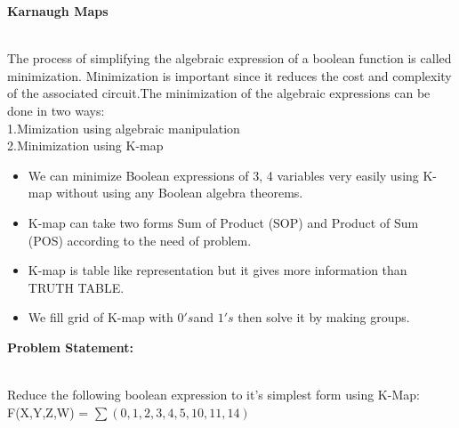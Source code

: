 \documentclass[10pt,a4paper]{report}
\begin{document}
\begin{multicols}{2}
\hspace{7.5cm} \textbf{Karnaugh Maps}\vspace{0.5cm}
\raggedright \\The process of simplifying the algebraic expression of a boolean function is called minimization. Minimization is important since it reduces the cost and complexity of the associated circuit.The minimization of the algebraic expressions can be done in two ways:\\1.Mimization using algebraic manipulation\\2.Minimization using K-map \vspace{3mm} \\ \begin{itemize}


\item We can minimize Boolean expressions of 3, 4 variables very easily using K-map without using any Boolean algebra theorems.
\item K-map can take two forms Sum of Product (SOP) and Product of Sum (POS) according to the need of problem. 
\item K-map is table like representation but it gives more information than TRUTH TABLE.
\item We fill grid of K-map with $0's $and $1's$ then solve it by making groups.\vspace{2mm}
\end{itemize}
\raggedright \textbf{Problem Statement:}\vspace{2mm}
\raggedright \\Reduce the following boolean expression to it's simplest form using K-Map:
\center F(X,Y,Z,W) = $\sum(0,1,2,3,4,5,10,11,14)$
\vspace{5mm}



\newcommand{\implicantsol}[3][0]{
    \draw[rounded corners=3pt, fill=#3, opacity=0.3] ($(#2.north west)+(135:#1)$) rectangle ($(#2.south east)+(-45:#1)$);
    }


\newcommand{\implicant}[4][0]{
    \draw[rounded corners=3pt, fill=#4, opacity=0.3] ($(#2.north west)+(135:#1)$) rectangle ($(#3.south east)+(-45:#1)$);
    }

\newcommand{\implicantcostats}[4][0]{
    \draw[rounded corners=3pt, fill=#4, opacity=0.3] ($(rf.east |- #2.north)+(90:#1)$)-| ($(#2.east)+(0:#1)$) |- ($(rf.east |- #3.south)+(-90:#1)$);
    \draw[rounded corners=3pt, fill=#4, opacity=0.3] ($(cf.west |- #2.north)+(90:#1)$) -| ($(#3.west)+(180:#1)$) |- ($(cf.west |- #3.south)+(-90:#1)$);
}


\end{multicols}
\end{document}
